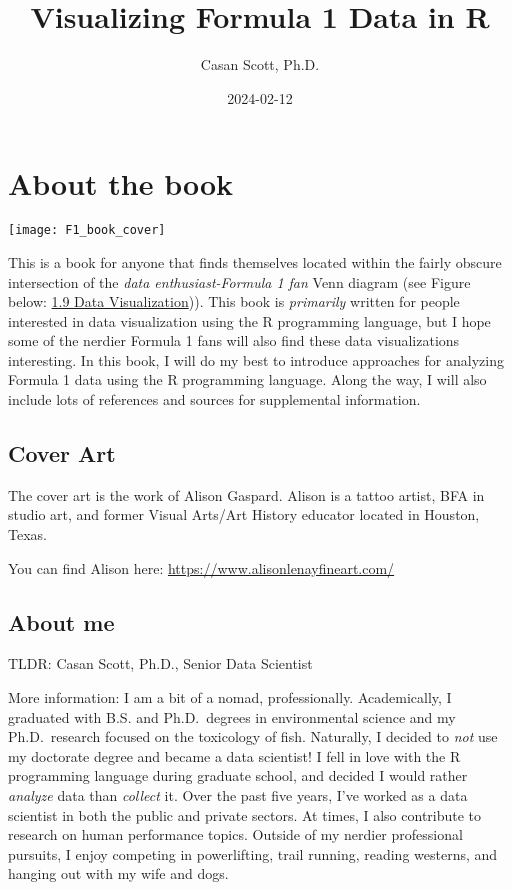 \documentclass[
]{book}
\title{Visualizing Formula 1 Data in R}
\author{Casan Scott, Ph.D.}
\date{2024-02-12}
\begin{document}
\maketitle

{
\setcounter{tocdepth}{1}
\tableofcontents
}
\hypertarget{about-the-book}{%
\chapter{About the book}\label{about-the-book}}

\begin{center}\texttt{[image: F1\_book\_cover]} \end{center}

This is a book for anyone that finds themselves located within the fairly obscure intersection of the \emph{data enthusiast-Formula 1 fan} Venn diagram (see Figure below: \protect\hyperlink{Dataux5cux2520Visualization}{1.9 Data Visualization})). This book is \emph{primarily} written for people interested in data visualization using the R programming language, but I hope some of the nerdier Formula 1 fans will also find these data visualizations interesting. In this book, I will do my best to introduce approaches for analyzing Formula 1 data using the R programming language. Along the way, I will also include lots of references and sources for supplemental information.

\newpage

\hypertarget{cover-art}{%
\section{Cover Art}\label{cover-art}}

The cover art is the work of Alison Gaspard. Alison is a tattoo artist, BFA in studio art, and former Visual Arts/Art History educator located in Houston, Texas.

You can find Alison here: \url{https://www.alisonlenayfineart.com/}

\hypertarget{about-me}{%
\section{About me}\label{about-me}}

TLDR: Casan Scott, Ph.D., Senior Data Scientist

More information: I am a bit of a nomad, professionally. Academically, I graduated with B.S. and Ph.D.~degrees in environmental science and my Ph.D.~research focused on the toxicology of fish. Naturally, I decided to \emph{not} use my doctorate degree and became a data scientist! I fell in love with the R programming language during graduate school, and decided I would rather \emph{analyze} data than \emph{collect} it. Over the past five years, I've worked as a data scientist in both the public and private sectors. At times, I also contribute to research on human performance topics. Outside of my nerdier professional pursuits, I enjoy competing in powerlifting, trail running, reading westerns, and hanging out with my wife and dogs.
\end{document}
